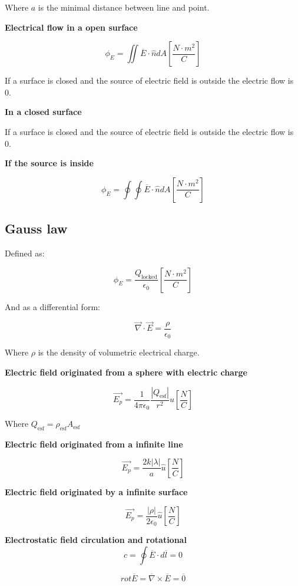 \documentclass[letterpaper]{article}
\newcommand{\divline}{\noindent\makebox[\linewidth]{\rule{\textwidth}{0.4pt}}}
\begin{document}
\begin{multicols}{3}
        Where \(a\) is the minimal distance between line and point.
        
        \textbf{Electrical flow in a open surface}

        \[\phi_{E} = \iint \overline{E} \cdot \hat{n} dA \left[ \frac{N \cdot m^{2}}{C} \right] \]

        If a surface is closed and the source of electric field is outside the electric flow is 0.

        \textbf{In a closed surface}

        If a surface is closed and the source of electric field is outside the electric flow is 0.

        \textbf{If the source is inside}

        \[\phi_{E} = \oint\oint \overline{E} \cdot \hat{n} dA \left[ \frac{N \cdot m^{2}}{C} \right] \]
    \end{multicols}

    \divline
    \begin{multicols}{3}
        \section{Gauss law}

        Defined as:
        
        \[\phi_{E} = \frac{Q_{\text{locked}}}{\epsilon_{0}} \left[ \frac{N \cdot m^{2}}{C} \right] \]

        And as a differential form:

        \[\overrightarrow{\nabla} \cdot \overrightarrow{E} = \frac{\rho}{\epsilon_{0}}\]

        Where \(\rho\) is the density of volumetric electrical charge.

        \textbf{Electric field originated from a sphere with electric charge}

        \[\overrightarrow{E_{p}} = \frac{1}{4 \pi \epsilon_{0}} \frac{|Q_{\text{esf}}|}{r^{2}} \hat{u} \left[ \frac{N}{C} \right] \]

        Where \(Q_{\text{esf}} = \rho_{\text{esf}}A_{\text{esf}}\)

        \textbf{Electric field originated from a infinite line}

        \[\overrightarrow{E_{p}} = \frac{2k |\lambda|}{a} \hat{u} \left[ \frac{N}{C} \right] \]

        \textbf{Electric field originated by a infinite surface}

        \[\overrightarrow{E_{p}} = \frac{|\rho|}{2\epsilon_{0}} \hat{u} \left[ \frac{N}{C} \right]\]
    
        \textbf{Electrostatic field circulation and rotational}
        \[c = \oint \overline{E} \cdot d \overline{l} = 0\]

        \[rot \overline{E} = \overline{\nabla} \times \overline{E} = \overline{0}\]
    \end{multicols}
\end{document}
